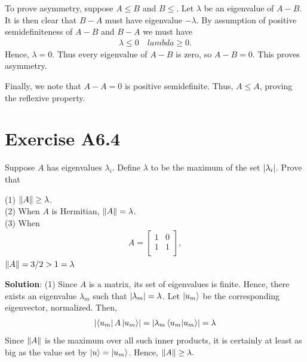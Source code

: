 \documentclass{book}
\begin{document}
    To prove asymmetry, suppose $A\leq B$ and $B \leq $. Let $\lambda$ be an eigenvalue of $A-B$. It is then clear that $B-A$ must have eigenvalue $-\lambda$. By assumption of positive semidefiniteness of $A-B$ and $B-A$ we must have 
    \begin{align}
        \lambda \leq 0 \quad lambda \geq 0.
    \end{align}
    Hence, $\lambda = 0$. Thus every eigenvalue of $A-B$ is zero, so $A - B = 0$. This proves asymmetry.
    
    Finally, we note that $A-A = 0$ is positive semidefinite. Thus, $A\leq A$, proving the reflexive property.

\section*{Exercise A6.4}
    Suppose $A$ has eigenvalues $\lambda_i$. Define $\lambda$ to be the maximum of the set $\abs{\lambda_i}$. Prove that
    
    (1) $\norm{A} \geq \lambda$. \\
    \indent (2) When $A$ is Hermitian, $\norm{A}=\lambda$. \\
    \indent (3) When
    \begin{align}
        A = 
        \begin{bmatrix}
            1 & 0 \\
            1 & 1 \\
        \end{bmatrix},
    \end{align}
    \indent $\norm{A}=3/2>1 = \lambda$
    
    \textbf{Solution}: (1) Since $A$ is a matrix, its set of eigenvalues is finite. Hence, there exists an eigenvalue $\lambda_m$ such that $\abs{\lambda_m} = \lambda$. Let $\ket{u_m}$ be the corresponding eigenvector, normalized. Then, 
    \begin{align}
        \abs{\bra{u_m}A\ket{u_m}} = \abs{\lambda_m \braket{u_m}{u_m}} = \lambda
    \end{align}
    Since $\norm{A}$ is the maximum over all such inner products, it is certainly at least as big as the value set by $\ket{u} = \ket{u_m}$. Hence, $\norm{A}\geq \lambda.$
    
\end{document}
